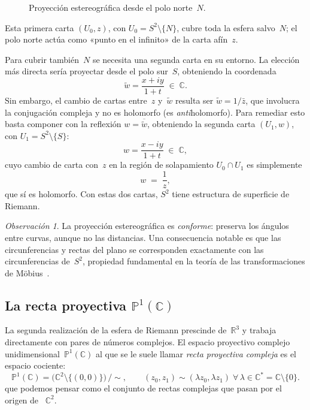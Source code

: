 \documentclass[11pt,a4paper]{article}
\theoremstyle{plain}
\theoremstyle{definition}
\theoremstyle{remark}
\newtheorem{observacion}[teorema]{Observación}
\newcommand{\C}{\mathbb{C}}
\newcommand{\R}{\mathbb{R}}
\newcommand{\Puno}{\mathbb{P}^1(\mathbb{C})}
\begin{document}
\begin{figure}[ht]
\caption{Proyección estereográfica desde el polo norte~$N$.
 }
\label{fig:stereo}
\end{figure}

Esta primera carta $(U_0, z)$, con $U_0 = S^2\setminus\{N\}$, cubre toda
la esfera salvo~$N$; el polo norte actúa como «punto en el infinito» de
la carta afín~$z$.

Para cubrir también~$N$ se necesita una segunda carta en su entorno.
La elección más directa sería proyectar desde el polo sur~$S$,
obteniendo la coordenada
\[
  \tilde{w} = \frac{x+iy}{1+t}\;\in\;\C.
\]
Sin embargo, el cambio de cartas entre~$z$ y~$\tilde{w}$ resulta ser
$\tilde{w} = 1/\bar{z}$, que involucra la conjugación compleja y
no es holomorfo (es \emph{anti}holomorfo).
Para remediar esto basta componer con la reflexión $w=\overline{\tilde{w}}$,
obteniendo la segunda carta $(U_1, w)$, con $U_1 = S^2\setminus\{S\}$:
\[
  w = \frac{x-iy}{1+t}\;\in\;\C,
\]
cuyo cambio de carta con~$z$ en la región de solapamiento $U_0\cap U_1$ es
simplemente
\[
  w \;=\; \frac{1}{z},
\]
que sí es holomorfo.
Con estas dos cartas, $S^2$ tiene estructura de superficie de Riemann.

\begin{observacion}
La proyección estereográfica es \emph{conforme}: preserva los ángulos
entre curvas, aunque no las distancias.
Una consecuencia notable es que las circunferencias y rectas del plano se
corresponden exactamente con las circunferencias de~$S^2$, propiedad fundamental
en la teoría de las transformaciones de Möbius~\cite{Needham1997}.
\end{observacion}

\subsection{La recta proyectiva \texorpdfstring{$\Puno$}{P1(C)}}

La segunda realización de la esfera de Riemann prescinde de~$\R^3$ y trabaja directamente con
pares de números complejos.
El espacio proyectivo complejo unidimensional~$\Puno$ al que se le suele llamar  \emph{recta proyectiva compleja} es el 
espacio cociente:
\[
  \Puno = \bigl(\C^2\setminus\{(0,0)\}\bigr)\,\big/\!\sim,
  \qquad
  (z_0,z_1)\sim(\lambda z_0,\lambda z_1)\;\forall\,\lambda\in\C^*= \C \setminus \{0\}.
\]
que podemos pensar como el conjunto de rectas complejas que pasan por el origen de ~$\C^2$.
\end{document}
